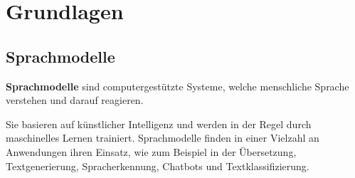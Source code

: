 \chapter{Grundlagen}\label{ch:preliminaries}








\section{Sprachmodelle}
\begin{definition}\label{def:sprachmodell}
   \textbf{Sprachmodelle} sind computergestützte Systeme, welche menschliche Sprache  verstehen und darauf reagieren.
\end{definition}
Sie basieren auf künstlicher Intelligenz und werden in der Regel durch maschinelles Lernen trainiert.
Sprachmodelle finden in einer Vielzahl an Anwendungen ihren Einsatz, wie zum Beispiel in der Übersetzung,
Textgenerierung, Spracherkennung, Chatbots und Textklassifizierung.

